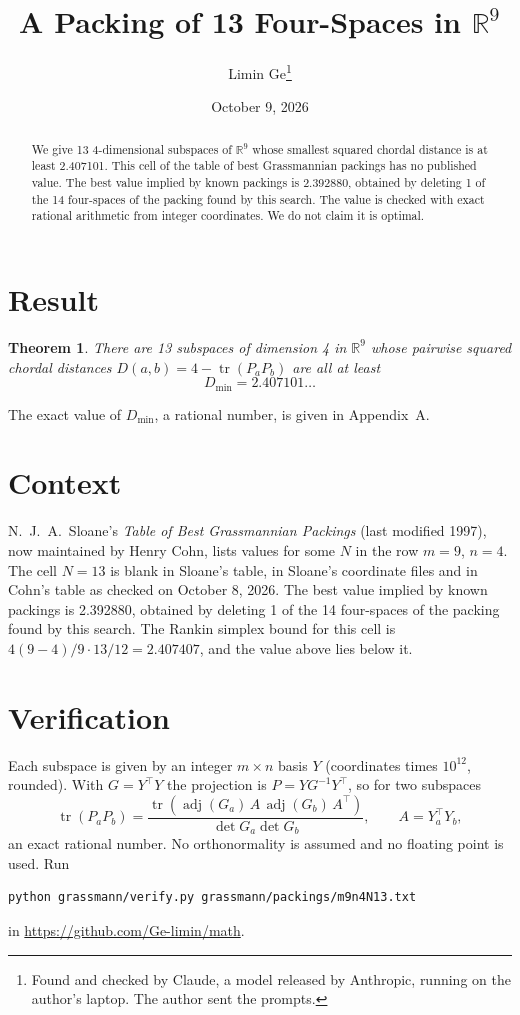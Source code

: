 \documentclass[11pt,a4paper]{article}
\title{A Packing of 13 Four-Spaces in $\mathbb{R}^{9}$}
\author{Limin Ge\thanks{Found and checked by Claude, a model released by Anthropic, running on the author's laptop. The author sent the prompts.}}
\date{October 9, 2026}
\newtheorem*{theorem}{Theorem}
\begin{document}
\maketitle
\begin{abstract}
We give 13 4-dimensional subspaces of $\mathbb{R}^{9}$ whose smallest squared chordal distance is at least 2.407101. This cell of the table of best Grassmannian packings has no published value. The best value implied by known packings is 2.392880, obtained by deleting 1 of the 14 four-spaces of the packing found by this search. The value is checked with exact rational arithmetic from integer coordinates. We do not claim it is optimal.
\end{abstract}

\section{Result}
\begin{theorem}
There are 13 subspaces of dimension 4 in $\mathbb{R}^{9}$ whose pairwise squared chordal distances $D(a,b) = 4 - \operatorname{tr}(P_aP_b)$ are all at least
\[ D_{\min} = 2.407101\ldots \]
\end{theorem}
The exact value of $D_{\min}$, a rational number, is given in Appendix~A.


\section{Context}
N.~J.~A.~Sloane's \emph{Table of Best Grassmannian Packings} (last modified 1997), now maintained by Henry Cohn, lists values for some $N$ in the row $m=9$, $n=4$. The cell $N=13$ is blank in Sloane's table, in Sloane's coordinate files and in Cohn's table as checked on October 8, 2026. The best value implied by known packings is 2.392880, obtained by deleting 1 of the 14 four-spaces of the packing found by this search. The Rankin simplex bound for this cell is $4(9-4)/9\cdot 13/12 = 2.407407$, and the value above lies below it.


\section{Verification}
Each subspace is given by an integer $m\times n$ basis $Y$ (coordinates times $10^{12}$, rounded). With $G=Y^\top Y$ the projection is $P=YG^{-1}Y^\top$, so for two subspaces
\[ \operatorname{tr}(P_aP_b)=\frac{\operatorname{tr}(\operatorname{adj}(G_a)\,A\,\operatorname{adj}(G_b)\,A^\top)}{\det G_a\det G_b},\qquad A=Y_a^\top Y_b, \]
an exact rational number. No orthonormality is assumed and no floating point is used. Run
\begin{verbatim}
python grassmann/verify.py grassmann/packings/m9n4N13.txt
\end{verbatim}
in \url{https://github.com/Ge-limin/math}.
\end{document}
